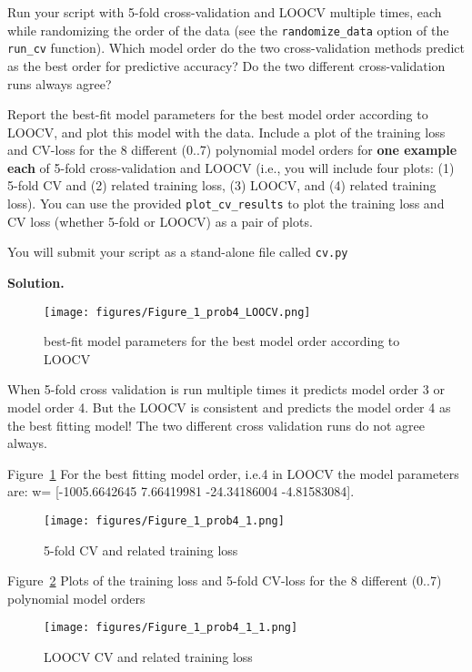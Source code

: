 \documentclass[10pt]{article}
\begin{document}
\begin{itemize}
Run your script with 5-fold cross-validation and LOOCV multiple times, each while randomizing the order of the data (see the {\tt randomize\_data} option of the {\tt run\_cv} function).
Which model order do the two cross-validation methods predict as the best order for predictive accuracy?
Do the two different cross-validation runs always agree?

Report the best-fit model parameters for the best model order according to LOOCV, and plot this model with the data.
Include a plot of the training loss and CV-loss for the 8 different (0..7) polynomial model orders for {\bf one example each} of 5-fold cross-validation and LOOCV (i.e., you will include four plots: (1) 5-fold CV and (2) related training loss, (3) LOOCV, and (4) related training loss).  You can use the provided {\tt plot\_cv\_results} to plot the training loss and CV loss (whether 5-fold or LOOCV) as a pair of plots.

You will submit your script as a stand-alone file called {\tt cv.py}

{\bf Solution.}   
\begin{figure}[htb]
\begin{center}
\texttt{[image: figures/Figure\_1\_prob4\_LOOCV.png]}
\caption{best-fit model parameters for the best model order according to LOOCV}
\label{fig3}
\end{center}
\end{figure}

When 5-fold cross validation is run multiple times it predicts model order 3 or model order 4. But the LOOCV is consistent and predicts the model order 4 as the best fitting model! The two different cross validation runs do not agree always.

Figure~\ref{fig3} For the best fitting model order,  i.e.4 in LOOCV the model parameters are: w=  [-1005.6642645      7.66419981   -24.34186004    -4.81583084].

\begin{figure}[htb]
\begin{center}
\texttt{[image: figures/Figure\_1\_prob4\_1.png]}
\caption{ 5-fold CV and related training loss}
\label{fig4}
\end{center}
\end{figure}

Figure~\ref{fig4} Plots of the training loss and 5-fold CV-loss for the 8 different (0..7) polynomial model orders 

\begin{figure}[htb]
\begin{center}
\texttt{[image: figures/Figure\_1\_prob4\_1\_1.png]}
\caption{ LOOCV CV and related training loss}
\label{fig5}
\end{center}
\end{figure}


\end{itemize}
\end{document}
